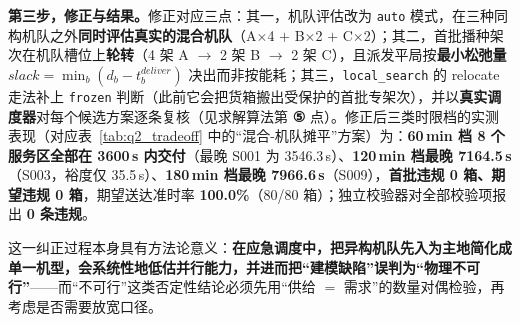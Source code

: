 \textbf{第三步，修正与结果。}修正对应三点：其一，机队评估改为 \texttt{auto} 模式，在三种同构机队之外\textbf{同时评估真实的混合机队}（A$\times$4 $+$ B$\times$2 $+$ C$\times$2）；其二，首批播种架次在机队槽位上\textbf{轮转}（4 架 A $\to$ 2 架 B $\to$ 2 架 C），且派发平局按\textbf{最小松弛量} $slack=\min_{b}(d_{b}-t_{b}^{deliver})$ 决出而非按能耗；其三，\texttt{local\_search} 的 relocate 走法补上 \texttt{frozen} 判断（此前它会把货箱搬出受保护的首批专架次），并以\textbf{真实调度器}对每个候选方案逐条复核（见求解算法第 \textbf{⑤} 点）。修正后三类时限档的实测表现（对应表~\ref{tab:q2_tradeoff} 中的“混合-机队摊平”方案）为：\textbf{60\,min 档 8 个服务区全部在 3600\,s 内交付}（最晚 S001 为 3546.3\,s）、\textbf{120\,min 档最晚 7164.5\,s}（S003，裕度仅 35.5\,s）、\textbf{180\,min 档最晚 7966.6\,s}（S009），\textbf{首批违规 0 箱、期望违规 0 箱}，期望送达准时率 \textbf{100.0\%}（80/80 箱）；独立校验器对全部校验项报出 \textbf{0 条违规}。

这一纠正过程本身具有方法论意义：\textbf{在应急调度中，把异构机队先入为主地简化成单一机型，会系统性地低估并行能力，并进而把“建模缺陷”误判为“物理不可行”}——而“不可行”这类否定性结论必须先用“供给 $=$ 需求”的数量对偶检验，再考虑是否需要放宽口径。

